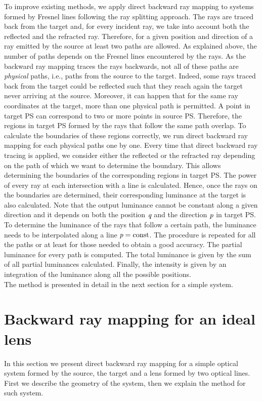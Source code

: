 To improve existing methods, we apply direct backward ray mapping to systems formed by Fresnel lines following the ray splitting approach. The rays are traced back from the target and, for every incident ray, we take into account both the reflected and the refracted ray. Therefore, for a given position and direction of a ray emitted by the source at least two paths are allowed. As explained above, the number of paths depends on the Fresnel lines encountered by the rays. As the backward ray mapping traces the rays backwards, not all of these paths are \textit{physical} paths, i.e., paths from the source to the target. Indeed, some rays traced back from the target could be reflected such that they reach again the target never arriving at the source. Moreover, it can happen that for the same ray coordinates at the target, more than one physical path is permitted. A point in target PS can correspond to two or more points in source PS. Therefore, the regions in target PS formed by the rays that follow the same path overlap. To calculate the boundaries of these regions correctly, we run direct backward ray mapping for each physical paths one by one. Every time that direct backward ray tracing is applied, we consider either the reflected or the refracted ray depending on the path of which we want to determine the boundary. This allows determining the boundaries of the corresponding regions in target PS. The power of every ray at each intersection with a line is calculated. Hence, once the rays on the boundaries are determined, their corresponding luminance at the target is also calculated. Note that the output luminance cannot be constant along a given direction and it depends on both the position $\textit{q}$ and the direction $\textit{p}$ in target PS. To determine the luminance of the rays that follow a certain path, the luminance needs to be interpolated along a line $\textit{p}= \textrm{const}$. The procedure is repeated for all the paths or at least for those needed to obtain a good accuracy. The partial luminance for every path is computed.
The total luminance is given by the sum of all partial luminances calculated.
Finally, the intensity is given by an integration of the luminance along all the possible positions.
\\ \indent
The method is presented in detail in the next section for a simple system.
\section{Backward ray mapping for an ideal lens}
In this section we present direct backward ray mapping for a simple optical system formed by the source, the target and a lens formed by two optical lines.
First we describe the geometry of the system, then we explain the method for such system.
